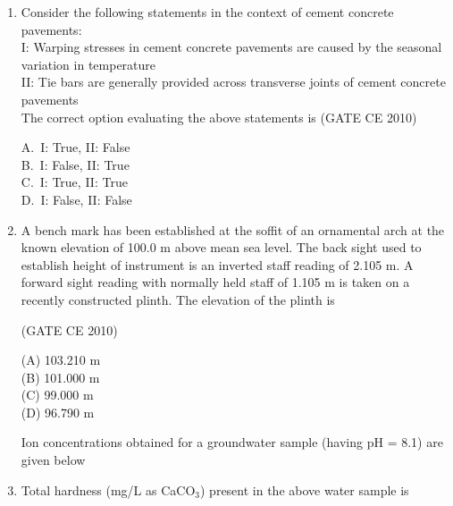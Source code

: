 \documentclass[journal,12pt,onecolumn]{exam}
\theoremstyle{remark}
\begin{document}
\begin{enumerate}
\noindent\item Consider the following statements in the context of cement concrete pavements: \\[0.1cm]
I: Warping stresses in cement concrete pavements are caused by the seasonal variation in temperature \\ 
II: Tie bars are generally provided across transverse joints of cement concrete pavements \\[0.2cm]
The correct option evaluating the above statements is
\hfill{(GATE CE 2010)}
\begin{multicols}{4}
A.\ I: True, II: False \\
B.\ I: False, II: True \\
C.\ I: True, II: True \\
D.\ I: False, II: False
\end{multicols}
\noindent\item A bench mark has been established at the soffit of an ornamental arch at the known elevation of 100.0 m above mean sea level. The back sight used to establish height of instrument is an inverted staff reading of 2.105 m. A forward sight reading with normally held staff of 1.105 m is taken on a recently constructed plinth. The elevation of the plinth is

\setlength{\parskip}{0.5cm}

\hfill{(GATE CE 2010)}

\begin{multicols}{4}
\noindent(A) 103.210 m\\
(B) 101.000 m\\
(C) 99.000 m\\
(D) 96.790 m
\end{multicols}

\setlength{\parskip}{0.5cm}


\noindent Ion concentrations obtained for a groundwater sample (having pH = 8.1) are given below
\begin{table}[H]
\label{table4}
\end{table}
\noindent\item Total hardness (mg/L as CaCO\(_3\)) present in the above water sample is


\end{enumerate}
\end{document}
